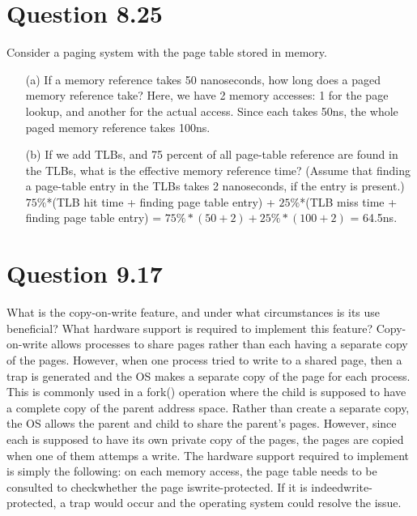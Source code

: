 \documentclass[12pt]{article}
\begin{document}
\section*{Question 8.25}{\color{blue}Consider a paging system with the page table stored in memory.
\begin{enumerate}
\item[(a)]If a memory reference takes 50 nanoseconds, how long does a paged memory reference take? {\color{black}
Here, we have 2 memory accesses: 1 for the page lookup, and another for the actual access. Since each takes 50ns, the whole paged memory reference takes 100ns.
}
\item[(b)]If we add TLBs, and 75 percent of all page-table reference are found in the TLBs, what is the effective memory reference time? (Assume that finding a page-table entry in the TLBs takes 2 nanoseconds, if the entry is present.) {\color{black} 
$75\%$*(TLB hit time + finding page table entry) + $25\%$*(TLB miss time + finding page table entry) = $75\%*(50+2) + 25\%*(100+2)$ =  64.5ns.
}
\end{enumerate}
}

\section*{Question 9.17}{\color{blue}What is the copy-on-write feature, and under what circumstances is its use beneficial? What hardware support is required to implement this feature?} Copy-on-write allows processes to share pages rather than each having a separate copy of the pages. However, when one process tried to write to a shared page, then a trap is generated and the OS makes a separate copy of the page for each process. This is commonly used in a fork() operation where the child is supposed to have a complete copy of the parent address space. Rather than create
a separate copy, the OS allows the parent and child to share the parent's pages. However, since each is supposed
to have its own private copy of the pages, the pages are copied when one of them attemps a write. The hardware support required to implement is simply the following: on each memory access, the page table needs to be consulted to
checkwhether the page iswrite-protected. If it is indeedwrite-protected, a trap would occur and the operating system could resolve the issue.
\end{document}
